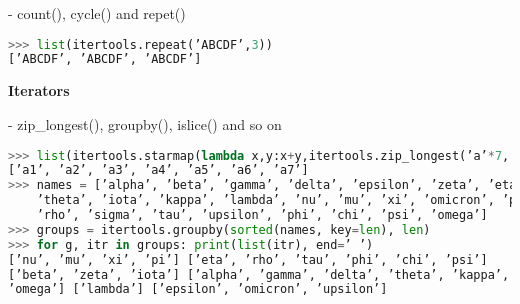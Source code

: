 - count(), cycle() and repet()

\begin{lstlisting}[language=Python]
>>> list(itertools.repeat(’ABCDF’,3))
[’ABCDF’, ’ABCDF’, ’ABCDF’]
\end{lstlisting}

\textbf{Iterators}

- zip_longest(), groupby(), islice() and so on

\begin{lstlisting}[language=Python]
>>> list(itertools.starmap(lambda x,y:x+y,itertools.zip_longest(’a’*7,’1234567’)))
[’a1’, ’a2’, ’a3’, ’a4’, ’a5’, ’a6’, ’a7’]
>>> names = [’alpha’, ’beta’, ’gamma’, ’delta’, ’epsilon’, ’zeta’, ’eta’,
	’theta’, ’iota’, ’kappa’, ’lambda’, ’nu’, ’mu’, ’xi’, ’omicron’, ’pi’,
	’rho’, ’sigma’, ’tau’, ’upsilon’, ’phi’, ’chi’, ’psi’, ’omega’]
>>> groups = itertools.groupby(sorted(names, key=len), len)
>>> for g, itr in groups: print(list(itr), end=’ ’)
[’nu’, ’mu’, ’xi’, ’pi’] [’eta’, ’rho’, ’tau’, ’phi’, ’chi’, ’psi’]
[’beta’, ’zeta’, ’iota’] [’alpha’, ’gamma’, ’delta’, ’theta’, ’kappa’, ’sigma’,
’omega’] [’lambda’] [’epsilon’, ’omicron’, ’upsilon’]
\end{lstlisting}